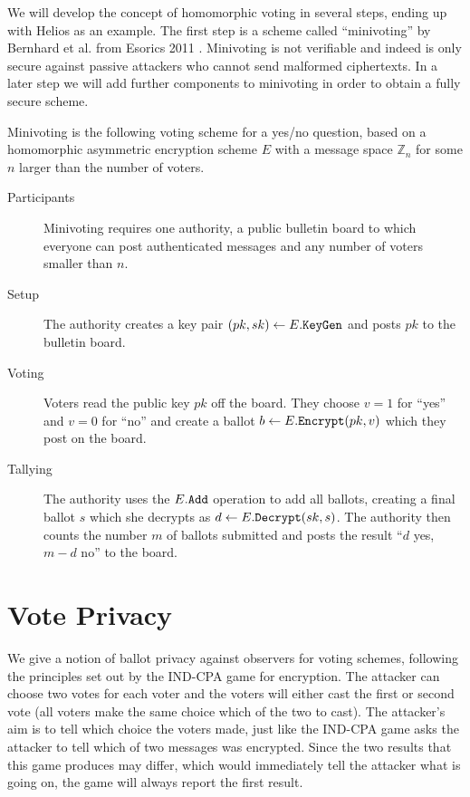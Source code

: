 \documentclass[envcountsame]{llncs}
\newcommand{\alg}[1]{\textup{\texttt{#1}}}
\begin{document}
We will develop the concept of homomorphic voting in several steps, ending up
with Helios as an example. The first step is a scheme called ``minivoting'' by
Bernhard et al. from Esorics 2011 \cite{BCPSW11}. Minivoting is not verifiable
and indeed is only secure against passive attackers who cannot send malformed
ciphertexts. In a later step we will add further components to minivoting in
order to obtain a fully secure scheme.

\begin{definition}
Minivoting is the following voting scheme for a yes/no question, based on a
homomorphic asymmetric encryption scheme $E$ with a message space $\mathbb Z_n$
for some $n$ larger than the number of voters.
\begin{description}
\item[Participants] Minivoting requires one authority, a public bulletin board
to which everyone can post authenticated messages and any number of voters
smaller than $n$.
\item[Setup]
The authority creates a key pair $(pk, sk) \gets E.\alg{KeyGen}$ and posts $pk$
to the bulletin board.
\item[Voting] Voters read the public key $pk$ off the board. They choose $v = 1$
for ``yes'' and $v = 0$ for ``no'' and create a ballot $b \gets
E.\alg{Encrypt}(pk, v)$ which they post on the board.
\item[Tallying] The authority uses the $E.\alg{Add}$ operation to add all
ballots, creating a final ballot $s$ which she decrypts as $d \gets E.\alg{Decrypt}
(sk, s)$. The authority then counts the number $m$ of ballots submitted and
posts the result ``$d$ yes, $m-d$ no'' to the board.
\end{description}
\end{definition}

\section{Vote Privacy}

We give a notion of ballot privacy against observers for voting schemes,
following the principles set out by the IND-CPA game for encryption. The
attacker can choose two votes for each voter and the voters will either cast the
first or second vote (all voters make the same choice which of the two to cast).
The attacker's aim is to tell which choice the voters made, just like the
IND-CPA game asks the attacker to tell which of two messages was encrypted.
Since the two results that this game produces may differ, which would
immediately tell the attacker what is going on, the game will always report the
first result.
\end{document}
